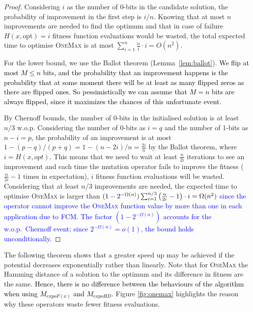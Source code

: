 \documentclass[lettersize,journal]{IEEEtran}
\newcommand{\new}[1]{\textcolor{black}{#1}}
\newcommand{\rev}[1]{\textcolor{blue}{#1}}
\begin{document}
\begin{proof}
Considering $i$ as the number of 0-bits in the candidate solution, the probability of improvement in the first step is $i/n$. Knowing that at most $n$ improvements are needed to find the optimum and that in case of failure $H(x,\text{opt})=i$ fitness function evaluations would be wasted, the total expected time to optimise \textsc{OneMax} is at most $\sum_{i=1}^n \frac{n}{i} \cdot i =O(n^2)$.

For the lower bound, we use the Ballot theorem (Lemma~\ref{lem:ballot}). 
\new{We flip at most $M \le n$ bits, and the probability that an improvement happens is the probability that at some moment there will be at least as many flipped zeros as there are flipped ones. So pessimistically we can assume that  $M = n$ bits are always flipped, since it maximizes the chances of this unfortunate event.} 

By Chernoff bounds, the number of 0-bits in the initialised solution is at least $n/3$ w.o.p. Considering the number of 
0-bits as $i=q$ and the number of 1-bits as $n-i=p$, the probability of 
an improvement is at most $1-(p-q)/(p+q)=1-(n-2i)/n=\frac{2i}{n}$ by the Ballot theorem, where $i=H(x, opt)$. This means that we need to wait at least $\frac{n}{2i}$ iterations to see an improvement and each time the mutation operator fails to improve the fitness {(\color{black}$\frac{n}{2i} - 1$ times in expectation)}, $i$ fitness function evaluations will be wasted. Considering that at least $n/3$ improvements are needed, the expected time to optimise \textsc{OneMax} is larger than \textcolor{blue}{$(1-2^{-\Omega(n)})\sum_{i=1}^{n/3} {\color{black}\left(\frac{n}{2i}-1\right)} \cdot i = \Omega(n^2)$} \rev{since the operator cannot improve the \textsc{OneMax} function value by more than one in each application due to FCM. The factor $(1-2^{-\Omega(n)})$ accounts for the w.o.p.\ Chernoff event; since $2^{-\Omega(n)}=o(1)$, the bound holds unconditionally}.
\end{proof}

The following theorem shows that a greater speed up may be achieved if the potential decreases exponentially rather than linearly. Note that for \textsc{OneMax} the Hamming distance of a solution to the optimum and its difference in fitness are the same. \new{Hence, there is no difference between the behaviours of the algorithm when using $M_{expoF(x)}$ and $M_{expoHD}$.} 
Figure \ref{fig:onemax} highlights the reason why these operators waste fewer fitness evaluations.
\end{document}
